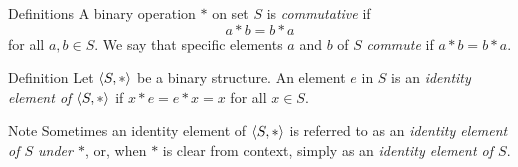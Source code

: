 \begin{df}{Definitions} A binary operation $*$ on set $S$ is \textit{commutative} if
$$a*b=b*a$$ for all $a,b\in S$. We say that specific elements
$a$ and $b$ of $S$ \textit{commute} if $a*b=b*a$.\end{df}

\begin{df}{Definition} Let $\langle S,*\rangle$ be a binary structure.  An element $e$ in
$S$ is an \textit{identity element of $\langle S,*\rangle$} if $x*e=e*x=x$ for all
$x\in S$.\end{df}

\begin{df}{Note} Sometimes an identity element of $\langle S,*\rangle$ is referred to as an \textit{identity element of $S$ under $*$}, or, when $*$ is clear from context, simply
as an \textit{identity element of $S$}.\end{df}


